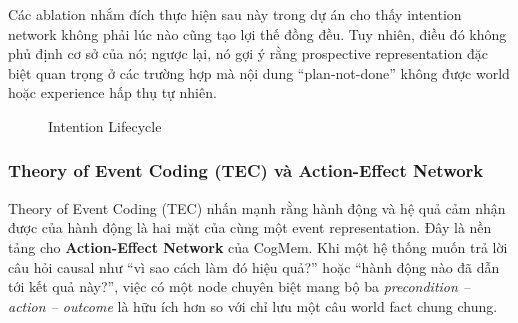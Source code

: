 \documentclass[../main.tex]{subfiles}
\begin{document}
Các ablation nhắm đích thực hiện sau này trong dự án cho thấy intention network không phải lúc nào cũng tạo lợi thế đồng đều. Tuy nhiên, điều đó không phủ định cơ sở của nó; ngược lại, nó gợi ý rằng prospective representation đặc biệt quan trọng ở các trường hợp mà nội dung ``plan-not-done'' không được world hoặc experience hấp thụ tự nhiên.

\begin{figure}[H]
\centering
{}
\caption{Intention Lifecycle}
\label{fig:ch4_intention_lifecycle}
\end{figure}

\subsubsection{Theory of Event Coding (TEC) và Action-Effect Network}

Theory of Event Coding (TEC) nhấn mạnh rằng hành động và hệ quả cảm nhận được của hành động là hai mặt của cùng một event representation. Đây là nền tảng cho \textbf{Action-Effect Network} của CogMem. Khi một hệ thống muốn trả lời câu hỏi causal như ``vì sao cách làm đó hiệu quả?'' hoặc ``hành động nào đã dẫn tới kết quả này?'', việc có một node chuyên biệt mang bộ ba \textit{precondition -- action -- outcome} là hữu ích hơn so với chỉ lưu một câu world fact chung chung.
\end{document}
